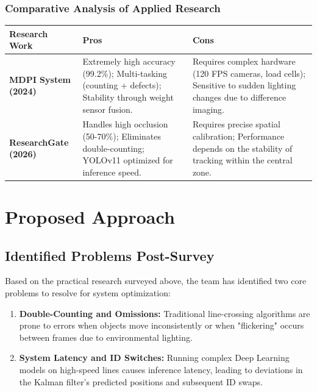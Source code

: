 \documentclass[12pt,a4paper]{report}
\begin{document}
\subsection{Comparative Analysis of Applied Research}
\begin{center}
\small
\renewcommand{\arraystretch}{1.5}
\begin{tabularx}{\textwidth}{|p{3.5cm}|X|X|}
\hline
\textbf{Research Work} & \textbf{Pros} & \textbf{Cons} \\ \hline
\textbf{MDPI System (2024)} & Extremely high accuracy (99.2\%); Multi-tasking (counting + defects); Stability through weight sensor fusion. & Requires complex hardware (120 FPS cameras, load cells); Sensitive to sudden lighting changes due to difference imaging. \\ \hline
\textbf{ResearchGate (2026)} & Handles high occlusion (50-70\%); Eliminates double-counting; YOLOv11 optimized for inference speed. & Requires precise spatial calibration; Performance depends on the stability of tracking within the central zone. \\ \hline
\end{tabularx}
\end{center}

\chapter{Proposed Approach}

\section{Identified Problems Post-Survey}
Based on the practical research surveyed above, the team has identified two core problems to resolve for system optimization:
\begin{enumerate}
    \item \textbf{Double-Counting and Omissions:} Traditional line-crossing algorithms are prone to errors when objects move inconsistently or when "flickering" occurs between frames due to environmental lighting.
    \item \textbf{System Latency and ID Switches:} Running complex Deep Learning models on high-speed lines causes inference latency, leading to deviations in the Kalman filter's predicted positions and subsequent ID swaps.
\end{enumerate}
\end{document}

